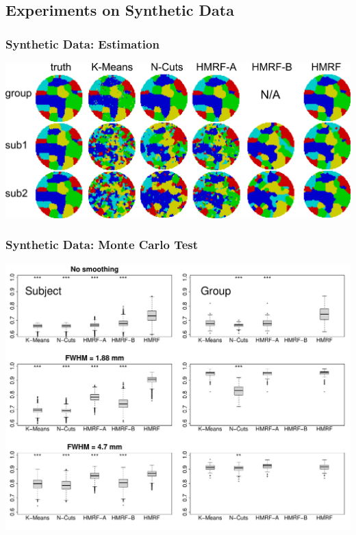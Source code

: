 \documentclass[sansserif, 10pt]{beamer}
\begin{document}
\begin{frame}
\end{frame}



\subsection{Experiments on Synthetic Data}
\begin{frame}
  \frametitle{Synthetic Data: Estimation~\cite{liu2013functional}}
  \includegraphics[width = 1\textwidth]{sfig/allmaps}
\end{frame}

\begin{frame}
  \frametitle{Synthetic Data: Monte Carlo Test}
  \includegraphics[width = 1\textwidth]{sfig/2level_3smoothing}
\end{frame}
\end{document}
